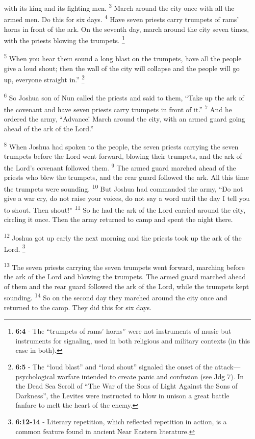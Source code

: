 \documentclass[12pt,twoside]{article}
\newcommand{\vs}[1]{\textsuperscript{#1}}
\newcommand{\vnote}[2]{%
  \begingroup
  \renewcommand\thefootnote{}%
  \footnote{\scriptsize \textbf{}#2}%
  \addtocounter{footnote}{-1}%
  \endgroup
}
\begin{document}
\noindent with its king and its fighting men.
\vs{3} March around the city once with all the armed men. Do this for six days.
\vs{4} Have seven priests carry trumpets of rams' horns in front of the ark. On the seventh day, march around the city seven times, with the priests blowing the trumpets.\vnote{4}{\textbf{6:4} - The “trumpets of rams’ horns” were not instruments of music but instruments for signaling, used in both religious and military contexts (in this case in both).}
\vs{5} When you hear them sound a long blast on the trumpets, have all the people give a loud shout; then the wall of the city will collapse and the people will go up, everyone straight in.''\vnote{5}{\textbf{6:5} - The “loud blast” and “loud shout” signaled the onset of the attack—psychological warfare intended to create panic and
confusion (see Jdg 7). In the Dead Sea Scroll of “The War of the Sons of Light Against the Sons of Darkness”, the Levites were instructed to blow in unison a great battle fanfare to melt the heart of the enemy.}

\vs{6} So Joshua son of Nun called the priests and said to them, ``Take up the ark of the covenant and have seven priests carry trumpets in front of it.''
\vs{7} And he ordered the army, ``Advance! March around the city, with an armed guard going ahead of the ark of the Lord.''

\vs{8} When Joshua had spoken to the people, the seven priests carrying the seven trumpets before the Lord went forward, blowing their trumpets, and the ark of the Lord's covenant followed them.
\vs{9} The armed guard marched ahead of the priests who blew the trumpets, and the rear guard followed the ark. All this time the trumpets were sounding.
\vs{10} But Joshua had commanded the army, ``Do not give a war cry, do not raise your voices, do not say a word until the day I tell you to shout. Then shout!''
\vs{11} So he had the ark of the Lord carried around the city, circling it once. Then the army returned to camp and spent the night there.

\vs{12} Joshua got up early the next morning and the priests took up the ark of the Lord.\vnote{12}{\textbf{6:12-14} - Literary repetition, which reflected repetition in action, is a common feature found in ancient Near Eastern
literature.}
\vs{13} The seven priests carrying the seven trumpets went forward, marching before the ark of the Lord and blowing the trumpets. The armed guard marched ahead of them and the rear guard followed the ark of the Lord, while the trumpets kept sounding.
\vs{14} So on the second day they marched around the city once and returned to the camp. They did this for six days.
\end{document}
